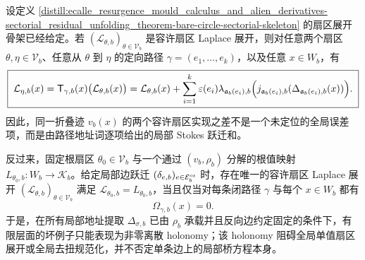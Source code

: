 \begin{theorem}\label{distill:ecalle_resurgence_mould_calculus_and_alien_derivatives-sectorial_residual_unfolding_theorem-bare-circle-stokes-transition-holonomy-classification}
设定义 \ref{distill:ecalle_resurgence_mould_calculus_and_alien_derivatives-sectorial_residual_unfolding_theorem-bare-circle-sectorial-skeleton} 的扇区展开骨架已经给定。若
\((\mathcal L_{\theta,b})_{\theta\in\mathcal V_b}\) 是容许扇区 Laplace 展开，则对任意两个扇区 \(\theta,\eta\in\mathcal V_b\)、任意从 \(\theta\) 到 \(\eta\) 的定向路径
\(\gamma=(e_1,\ldots,e_k)\)，以及任意 \(x\in W_b\)，有
\[
\boxed{\;
\mathcal L_{\eta,b}(x)=\mathsf T_{\gamma,b}(x)\bigl(\mathcal L_{\theta,b}(x)\bigr)
=\mathcal L_{\theta,b}(x)+
\sum_{i=1}^k
\varepsilon(e_i)\lambda_{\mathfrak a_b(e_i),b}
\Bigl(j_{\mathfrak a_b(e_i),b}(\Delta_{\mathfrak a_b(e_i),b}(x))\Bigr).
\;}
\]
因此，同一折叠迹 \(v_b(x)\) 的两个容许扇区实现之差不是一个未定位的全局误差项，而是由路径地址词逐项给出的局部 Stokes 跃迁和。

反过来，固定根扇区 \(\theta_0\in\mathcal V_b\) 与一个通过 \((v_b,\rho_b)\) 分解的根值映射
\(L_{\theta_0,b}:W_b\to\mathcal K_b\)。给定局部边跃迁 \((\delta_{e,b})_{e\in\mathcal E_b^{\rm or}}\) 时，存在唯一的容许扇区 Laplace 展开
\((\mathcal L_{\theta,b})_{\theta\in\mathcal V_b}\) 满足
\(\mathcal L_{\theta_0,b}=L_{\theta_0,b}\)，当且仅当对每条闭路径 \(\gamma\) 与每个
\(x\in W_b\) 都有
\[
\Omega_{\gamma,b}(x)=0.
\]
于是，在所有局部地址提取 \(\Delta_{\sigma,b}\) 已由 \(\rho_b\) 承载并且反向边约定固定的条件下，有限层面的坏例子只能表现为非零离散 holonomy；该 holonomy 阻碍全局单值扇区展开或全局去扭规范化，并不否定单条边上的局部桥方程本身。
\end{theorem}
